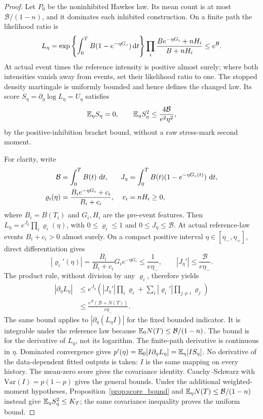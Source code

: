 \begin{proof}
Let \(P_0\) be the noninhibited Hawkes law. Its mean count is at most \(\mathcal B/(1-n)\), and it dominates each inhibited construction. On a finite path the likelihood ratio is
\[
L_\eta=\exp\left\{\int_0^TB(1-e^{-\eta G_s})\mathop{}\!\mathrm{d} t\right\}
\prod_i\frac{Be^{-\eta G_i}+nH_i}{B+nH_i}\le e^{\mathcal B}.
\]
At actual event times the reference intensity is positive almost surely; where both intensities vanish away from events, set their likelihood ratio to one. The stopped density martingale is uniformly bounded and hence defines the changed law. Its score \(S_\eta=\partial_\eta\log L_\eta=U_\eta\) satisfies
\[
\mathbb{E} _\eta S_\eta=0,\qquad
\mathbb{E} _\eta S_\eta^2\le\frac{4\mathcal B}{e^2\eta^2},
\]
by the positive-inhibition bracket bound, without a raw stress-mark second moment.

For clarity, write
\[
\begin{aligned}
 \mathcal B&=\int_0^T B(t)\,\mathop{}\!\mathrm{d} t,
 &J_\eta&=\int_0^T B(t)(1-e^{-\eta G_s(t)})\,\mathop{}\!\mathrm{d} t,\\
 \varrho_i(\eta)&=\frac{B_i e^{-\eta G_i}+c_i}{B_i+c_i},
 &c_i&=nH_i\geq0,
\end{aligned}
\]
where $B_i=B(T_i)$ and $G_i,H_i$ are the pre-event features. Then
$L_\eta=e^{J_\eta}\prod_i\varrho_i(\eta)$, with $0\leq \varrho_i\leq1$ and
$0\leq J_\eta\leq\mathcal B$. At actual reference-law events
$B_i+c_i>0$ almost surely. On a compact positive interval
$\eta\in[\eta_-,\eta_+]$, direct differentiation gives
\[
 |\varrho_i'(\eta)|
 =\frac{B_i}{B_i+c_i}G_i e^{-\eta G_i}
 \leq\frac{1}{e\eta_-},
 \qquad
 |J_\eta'|\leq\frac{\mathcal B}{e\eta_-}.
\]
The product rule, without division by any $\varrho_i$, therefore yields
\[
\begin{aligned}
 |\partial_\eta L_\eta|
 &\leq e^{J_\eta}\left(
 |J_\eta'|\prod_i\varrho_i+
 \sum_i |\varrho_i'|\prod_{j\ne i}\varrho_j\right)\\
 &\leq\frac{e^{\mathcal B}(\mathcal B+N(T))}{e\eta_-}.
\end{aligned}
\]
The same bound applies to $|\partial_\eta(L_\eta I)|$ for the fixed bounded
indicator. It is integrable under the reference law because
$\mathbb{E} _0N(T)\leq\mathcal B/(1-n)$. The bound is for the derivative of
$L_\eta$, not its logarithm. The finite-path derivative is continuous in $\eta$. Dominated convergence gives
\(p'(\eta)=\mathbb{E} _0[I\partial_\eta L_\eta]=\mathbb{E} _\eta[IS_\eta]\).
No derivative of the data-dependent fitted outputs is taken: \(I\) is the same mapping on every history. The mean-zero score gives the covariance identity. Cauchy--Schwarz with \(\mathrm{Var}(I)=p(1-p)\) gives the general bounds. Under the additional weighted-moment hypotheses, Proposition~\ref{prop:score_bound} and \(\mathbb{E}_\eta N(T)\leq\mathcal B/(1-n)\) instead give \(\mathbb{E}_\eta S_\eta^2\leq K_T\); the same covariance inequality proves the uniform bound.
\end{proof}

